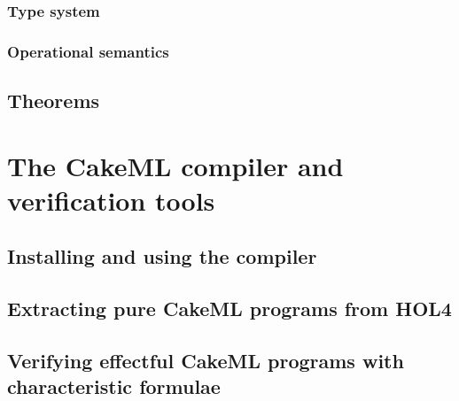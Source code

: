 \documentclass[12pt,a4paper]{book}
\begin{document}
\section{Type system}

\section{Operational semantics}

\chapter{Theorems}


\part{The CakeML compiler and verification tools}

\chapter{Installing and using the compiler}

\chapter{Extracting pure CakeML programs from HOL4}

\chapter{Verifying effectful CakeML programs with characteristic formulae}
\end{document}
